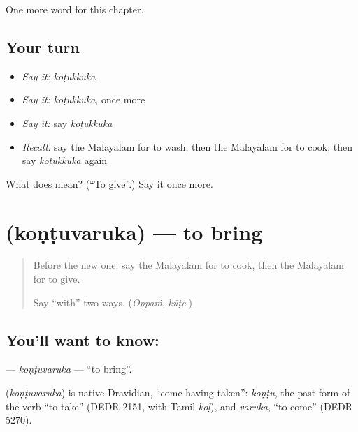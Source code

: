 \begin{grammarlens}[title={What you've built}]
One more word for this chapter.
\end{grammarlens}

\subsection*{Your turn}
\begin{itemize}
\raggedright
  \item \emph{Say it:} \emph{koṭukkuka}
  \item \emph{Say it:} \emph{koṭukkuka}, once more
  \item \emph{Say it:} say \emph{koṭukkuka}
  \item \emph{Recall:} say the Malayalam for to wash, then the Malayalam for to cook, then say \emph{koṭukkuka} again
\end{itemize}

\begin{tcolorbox}[breakable,colback=teal!4,colframe=teal!35!black,title={Before you move on}]
What does  mean? (\textquotedblleft{}To give\textquotedblright{}.) Say it once more.
\end{tcolorbox}
\section[\texorpdfstring{\ml{കൊണ്ടുവരുക} (koṇṭuvaruka)}{കൊണ്ടുവരുക (koṇṭuvaruka)}]{ (koṇṭuvaruka) — to bring}

\label{lesson:ML-C172-kontuvaruka}



\begin{quote}
Before the new one: say the Malayalam for to cook, then the Malayalam for to give.

Say \textquotedblleft{}with\textquotedblright{} two ways. (\emph{Oppaṁ}, \emph{kūṭe}.)
\end{quote}

\subsection*{You'll want to know: }
\textbf{} — \emph{koṇṭuvaruka} — \textquotedblleft{}to bring\textquotedblright{}.

\begin{cousinweb}
\textbf{} (\emph{koṇṭuvaruka}) is native Dravidian, \textquotedblleft{}come having taken\textquotedblright{}: \emph{koṇṭu}, the past form of the verb \textquotedblleft{}to take\textquotedblright{} (DEDR 2151, with Tamil \emph{koḷ}), and \emph{varuka}, \textquotedblleft{}to come\textquotedblright{} (DEDR 5270).
\end{cousinweb}


